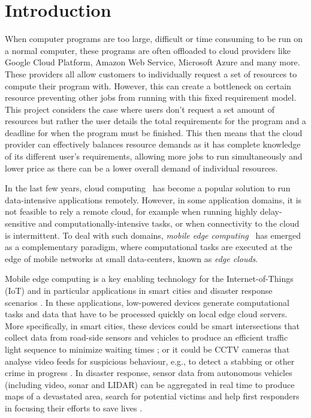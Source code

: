 \documentclass[sotoncolour]{extra/uosproject}     %
\begin{document}
\mainmatter
\chapter{Introduction}
When computer programs are too large, difficult or time consuming to be run on a normal computer, these programs are often offloaded to cloud providers like Google Cloud Platform, Amazon Web Service, Microsoft Azure and many more. These providers all allow customers to individually request a set of resources to compute their program with. However, this can create a bottleneck on certain resource preventing other jobs from running with this fixed requirement model. This project considers the case where users don't request a set amount of resources but rather the user details the total requirements for the program and a deadline for when the program must be finished. This then means that the cloud provider can effectively balances resource demands as it has complete knowledge of its different user's requirements, allowing more jobs to run simultaneously and lower price as there can be a lower overall demand of individual resources. 

In the last few years, cloud computing~\cite{cloud_cite} has become a popular solution to run data-intensive applications remotely. However, in some application domains, it is not feasible to rely a remote cloud, for example when running highly delay-sensitive and computationally-intensive tasks, or when connectivity to the cloud is intermittent. To deal with such domains, \emph{mobile edge computing}~\cite{mobile_edge_survey} has emerged as a complementary paradigm, where computational tasks are executed at the edge of mobile networks at small data-centers, known as \emph{edge clouds}.

Mobile edge computing is a key enabling technology for the Internet-of-Things (IoT) \cite{mobile_edge_IoT} and in particular applications in smart cities \cite{mobile_edge_smart} and disaster response scenarios \cite{mobile_edge_disaster}. In these applications, low-powered devices generate computational tasks and data that have to be processed quickly on local edge cloud servers. More specifically, in smart cities, these devices could be smart intersections that collect data from road-side sensors and vehicles to produce an efficient traffic light sequence to minimize waiting times \cite{smart_cities_traffic_lights}; or it could be CCTV cameras that analyse video feeds for suspicious behaviour, e.g., to detect a stabbing or other crime in progress \cite{Sreenu2019}. In disaster response, sensor data from autonomous vehicles (including video, sonar and LIDAR) can be aggregated in real time to produce maps of a devastated area, search for potential victims and help first responders in focusing their efforts to save lives \cite{smart_disaster_management}.
\end{document}
